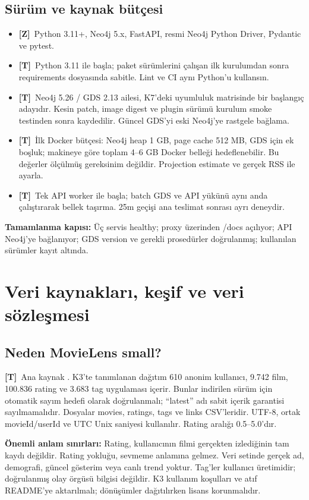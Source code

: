 \documentclass[11pt,a4paper]{article}
\newcommand{\code}[1]{\texttt{\detokenize{#1}}}
\newcommand{\must}{\textbf{[Z]}}
\newcommand{\design}{\textbf{[T]}}
\newcommand{\gate}[1]{\par\smallskip\noindent\colorbox{pale}{\parbox{0.96\linewidth}{\textbf{Tamamlanma kapısı:} #1}}\par\smallskip}
\begin{document}
\subsection{Sürüm ve kaynak bütçesi}
\begin{itemize}
\item \must\ Python 3.11+, Neo4j 5.x, FastAPI, resmi Neo4j Python Driver, Pydantic ve pytest.
\item \design\ Python 3.11 ile başla; paket sürümlerini çalışan ilk kurulumdan sonra requirements dosyasında sabitle. Lint ve CI aynı Python'u kullansın.
\item \design\ Neo4j 5.26 / GDS 2.13 ailesi, K7'deki uyumluluk matrisinde bir başlangıç adayıdır. Kesin patch, image digest ve plugin sürümü kurulum smoke testinden sonra kaydedilir. Güncel GDS'yi eski Neo4j'ye rastgele bağlama.
\item \design\ İlk Docker bütçesi: Neo4j heap 1 GB, page cache 512 MB, GDS için ek boşluk; makineye göre toplam 4--6 GB Docker belleği hedeflenebilir. Bu değerler ölçülmüş gereksinim değildir. Projection estimate ve gerçek RSS ile ayarla.
\item \design\ Tek API worker ile başla; batch GDS ve API yükünü aynı anda çalıştırarak bellek taşırma. 25m geçişi ana teslimat sonrası ayrı deneydir.
\end{itemize}

\gate{Üç servis healthy; proxy üzerinden /docs açılıyor; API Neo4j'ye bağlanıyor; GDS version ve gerekli prosedürler doğrulanmış; kullanılan sürümler kayıt altında.}

\section{Veri kaynakları, keşif ve veri sözleşmesi}
\subsection{Neden MovieLens small?}
\design\ Ana kaynak \code{ml-latest-small}. K3'te tanımlanan dağıtım 610 anonim kullanıcı, 9.742 film, 100.836 rating ve 3.683 tag uygulaması içerir. Bunlar indirilen sürüm için otomatik sayım hedefi olarak doğrulanmalı; ``latest'' adı sabit içerik garantisi sayılmamalıdır. Dosyalar movies, ratings, tags ve links CSV'leridir. UTF-8, ortak movieId/userId ve UTC Unix saniyesi kullanılır. Rating aralığı 0.5--5.0'dır.

\textbf{Önemli anlam sınırları:} Rating, kullanıcının filmi gerçekten izlediğinin tam kaydı değildir. Rating yokluğu, sevmeme anlamına gelmez. Veri setinde gerçek ad, demografi, güncel gösterim veya canlı trend yoktur. Tag'ler kullanıcı üretimidir; doğrulanmış olay örgüsü bilgisi değildir. K3 kullanım koşulları ve atıf README'ye aktarılmalı; dönüşümler dağıtılırken lisans korunmalıdır.
\end{document}
